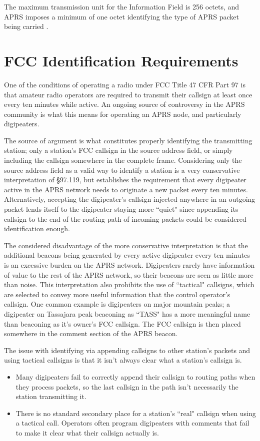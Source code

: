 The maximum transmission unit for the Information Field is 256 octets, and APRS imposes
a minimum of one octet identifying the type of APRS packet being carried \cite{aprsspec}.

\section{FCC Identification Requirements}

One of the conditions of operating a radio under FCC Title 47 CFR Part 97 is that amateur radio 
operators are required to transmit their callsign at least once every ten minutes while active.
An ongoing source of controversy in the APRS community is what this means for operating
an APRS node, and particularly digipeaters.

The source of argument is what constitutes properly identifying the
transmitting station; only a station's FCC callsign in the source address field,
or simply including the callsign somewhere in the complete frame.
Considering only the source address field as a valid way to identify a station is
a very conservative interpretation of \S97.119, but establishes the requirement that every 
digipeater active in the APRS network needs to originate a new packet every ten minutes.
Alternatively, accepting the digipeater's callsign injected anywhere in an outgoing 
packet lends itself to the digipeater staying more ``quiet" since appending its callsign
to the end of the routing path of incoming packets could be considered identification enough.

The considered disadvantage of the more conservative interpretation is that the additional
beacons being generated by every active digipeater every ten minutes is an
excessive burden on the APRS network. Digipeaters rarely have information of value
to the rest of the APRS network, so their beacons are seen as little more than noise.
This interpretation also prohibits the use of ``tactical" callsigns, which are selected
to convey more useful information that the control operator's callsign.
One common example is digipeaters on major mountain peaks; a digipeater 
on Tassajara peak beaconing as ``TASS" has a more meaningful name than beaconing as
it's owner's FCC callsign. The FCC callsign is then placed somewhere in the comment section
of the APRS beacon.

The issue with identifying via appending callsigns to other station's packets and
using tactical callsigns is that it isn't always clear what a station's callsign is.
\begin{itemize}
	\item Many digipeaters fail to correctly append their callsign to routing paths when
		they process packets, so the last callsign in the path isn't necessarily the 
		station transmitting it.
	\item There is no standard secondary place for a station's ``real" callsign 
		when using a tactical call.
		Operators often program digipeaters with comments that fail to make it clear
		what their callsign actually is.
\end{itemize}

